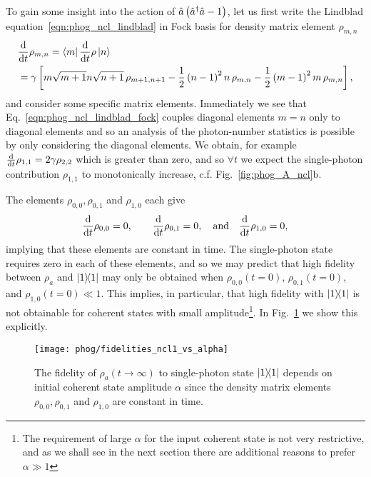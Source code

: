 To gain some insight into the action of $\hat{a}\left(\hat{a}^\dagger \hat{a} - 1\right)$, let us first write the Lindblad equation~\ref{eqn:phog_ncl_lindblad} in Fock basis for density matrix element $\rho_{m, n}$
\begin{align}\label{eqn:phog_ncl_lindblad_fock}
&\ddt \rho_{m, n} = \bra{m} \ddt \rho \ket{n} \notag  \\
%
&= \gamma \left[ m \sqrt{m+1} n \sqrt{n+1} \, \rho_{m+1, n+1} - \frac{1}{2} \left(n-1\right)^2 n\, \rho_{m, n} - \frac{1}{2} \left(m-1\right)^2 m\, \rho_{m, n}\right],
\end{align}
and consider some specific matrix elements. Immediately we see that Eq.~\ref{eqn:phog_ncl_lindblad_fock} couples diagonal elements $m=n$ only to diagonal elements and so an analysis of the photon-number statistics is possible by only considering the diagonal elements. We obtain, for example $\frac{\mathrm{d}}{\mathrm{d}t} \rho_{1, 1}=2 \gamma \rho_{2, 2}$ which is greater than zero, and so $\forall t$ we expect the single-photon contribution $\rho_{1,1}$ to monotonically increase, c.f. Fig.~\ref{fig:phog_A_ncl}b. 

\noindent The elements $\rho_{0, 0}, \rho_{0, 1}$ and $\rho_{1, 0}$ each give
\begin{equation}
\ddt \rho_{0,0} = 0, \qq{} \ddt \rho_{0, 1} = 0, \qq{and} \ddt\rho_{1, 0} = 0,
\end{equation}
implying that these elements are constant in time. The single-photon state requires zero in each of these elements, and so we may predict that high fidelity between $\rho_a$ and $\dyad{1}$ may only be obtained when $\rho_{0,0}\left(t=0\right)$, $\rho_{0, 1}\left(t=0\right)$, and $\rho_{1, 0}\left(t=0\right) \ll 1$. This implies, in particular, that high fidelity with $\dyad{1}$ is not obtainable for coherent states with small amplitude\footnote{The requirement of large $\alpha$ for the input coherent state is not very restrictive, and as we shall see in the next section there are additional reasons to prefer $\alpha \gg 1$}. In Fig.~\ref{fig:phog_fidelity_ncl_vs_alpha} we show this explicitly.

\begin{figure}[htp]
\captionsetup{width=0.8\linewidth}
\centering
\texttt{[image: phog/fidelities\_ncl1\_vs\_alpha]}
\caption{\label{fig:phog_fidelity_ncl_vs_alpha} The fidelity of $\rho_a\left(t\rightarrow\infty\right)$ to single-photon state $\dyad{1}$ depends on initial coherent state amplitude $\alpha$ since the density matrix elements $\rho_{0, 0}, \rho_{0, 1}$ and $\rho_{1, 0}$ are constant in time. %
}
\end{figure}




